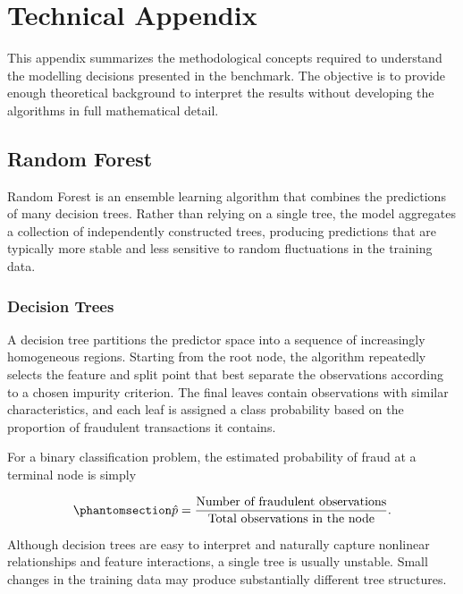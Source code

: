 \documentclass[
  12pt,
  letterpaper,
]{book}
\begin{document}
\section{Technical Appendix}\label{technical-appendix}

This appendix summarizes the methodological concepts required to
understand the modelling decisions presented in the benchmark. The
objective is to provide enough theoretical background to interpret the
results without developing the algorithms in full mathematical detail.

\subsection{Random Forest}\label{random-forest}

Random Forest is an ensemble learning algorithm that combines the
predictions of many decision trees. Rather than relying on a single
tree, the model aggregates a collection of independently constructed
trees, producing predictions that are typically more stable and less
sensitive to random fluctuations in the training data.

\subsubsection{Decision Trees}\label{decision-trees}

A decision tree partitions the predictor space into a sequence of
increasingly homogeneous regions. Starting from the root node, the
algorithm repeatedly selects the feature and split point that best
separate the observations according to a chosen impurity criterion. The
final leaves contain observations with similar characteristics, and each
leaf is assigned a class probability based on the proportion of
fraudulent transactions it contains.

For a binary classification problem, the estimated probability of fraud
at a terminal node is simply

\begin{equation}\phantomsection\label{eq-rf-probability}{
\hat{p}=\frac{\text{Number of fraudulent observations}}{\text{Total observations in the node}}.
}\end{equation}

Although decision trees are easy to interpret and naturally capture
nonlinear relationships and feature interactions, a single tree is
usually unstable. Small changes in the training data may produce
substantially different tree structures.
\end{document}
